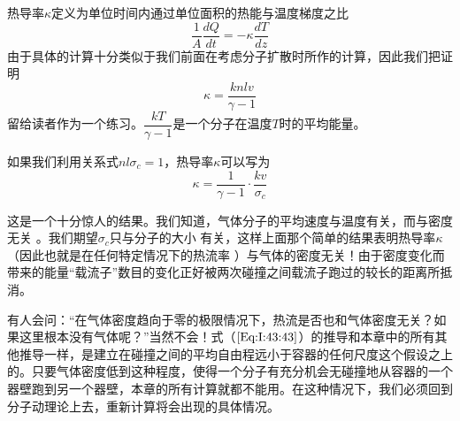 热导率$\kappa$定义为单位时间内通过单位面积的热能与温度梯度之比
\begin{equation}
    \label{Eq:I:43:41}
    \frac{1}{A}\frac{dQ}{dt} = -\kappa\frac{dT}{dz}
\end{equation}
由于具体的计算十分类似于我们前面在考虑分子扩散时所作的计算，因此我们把证明
\begin{equation}
    \label{Eq:I:43:42}
    \kappa = \frac{knlv}{\gamma -1}
\end{equation}
留给读者作为一个练习。$\dfrac{kT}{\gamma -1}$是一个分子在温度$T$时的平均能量。

如果我们利用关系式$nl\sigma_c =1$，热导率$\kappa$可以写为
\begin{equation}
    \label{Eq:I:43:43}
    \kappa = \frac{1}{\gamma - 1}\cdot\frac{kv}{\sigma_c}
\end{equation}

这是一个十分惊人的结果。我们知道，气体分子的平均速度与温度有关，而与密度无关 。我们期望$\sigma_c$只与分子的大小 有关，这样上面那个简单的结果表明热导率$\kappa$（因此也就是在任何特定情况下的热流率 ）与气体的密度无关！由于密度变化而带来的能量“载流子”数目的变化正好被两次碰撞之间载流子跑过的较长的距离所抵消。

有人会问：“在气体密度趋向于零的极限情况下，热流是否也和气体密度无关？如果这里根本没有气体呢？”当然不会！式（$\ref{Eq:I:43:43}$）的推导和本章中的所有其他推导一样，是建立在碰撞之间的平均自由程远小于容器的任何尺度这个假设之上的。只要气体密度低到这种程度，使得一个分子有充分机会无碰撞地从容器的一个器壁跑到另一个器壁，本章的所有计算就都不能用。在这种情况下，我们必须回到分子动理论上去，重新计算将会出现的具体情况。